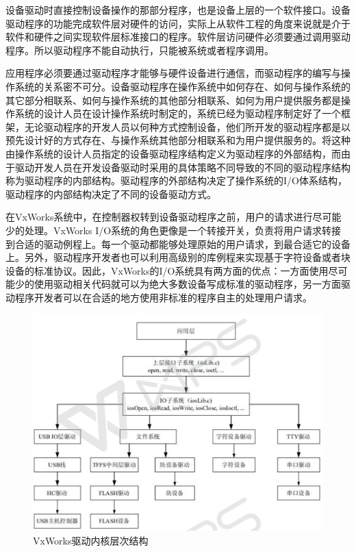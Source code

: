 	
	
	设备驱动时直接控制设备操作的那部分程序，也是设备上层的一个软件接口。设备驱动程序的功能完成软件层对硬件的访问，实际上从软件工程的角度来说就是介于软件和硬件之间实现软件层标准接口的程序。软件层访问硬件必须要通过调用驱动程序。所以驱动程序不能自动执行，只能被系统或者程序调用。
	
	应用程序必须要通过驱动程序才能够与硬件设备进行通信，而驱动程序的编写与操作系统的关系密不可分。设备驱动程序在操作系统中如何存在、如何与操作系统的其它部分相联系、如何与操作系统的其他部分相联系、如何为用户提供服务都是操作系统的设计人员在设计操作系统时制定的，系统已经为驱动程序制定好了一个框架，无论驱动程序的开发人员以何种方式控制设备，他们所开发的驱动程序都是以预先设计好的方式存在、与操作系统其他部分相联系和为用户提供服务的。将这种由操作系统的设计人员指定的设备驱动程序结构定义为驱动程序的外部结构，而由于驱动开发人员在开发设备驱动时采用的具体策略不同导致的不同的驱动程序结构称为驱动程序的内部结构。驱动程序的外部结构决定了操作系统的I/O体系结构，驱动程序的内部结构决定了不同的设备驱动方式。

	在VxWorks系统中，在控制器权转到设备驱动程序之前，用户的请求进行尽可能少的处理。VxWorks I/O系统的角色更像是一个转接开关，负责将用户请求转接到合适的驱动例程上。每一个驱动都能够处理原始的用户请求，到最合适它的设备上。另外，驱动程序开发者也可以利用高级别的库例程来实现基于字符设备或者块设备的标准协议。因此，VxWorks的I/O系统具有两方面的优点：一方面使用尽可能少的使用驱动相关代码就可以为绝大多数设备写成标准的驱动程序，另一方面驱动程序开发者可以在合适的地方使用非标准的程序自主的处理用户请求。


\begin{figure}[!h]
\centering
\includegraphics[width=1.0\textwidth]{./graphics/vxworks-kernel-diagram.pdf}
\caption{VxWorks驱动内核层次结构}\label{fig:VxWorks内核驱动层次结构}
\end{figure}



